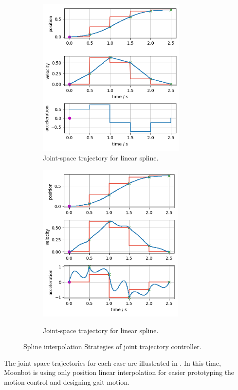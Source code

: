 \begin{figure}[t]
 \begin{subfigure}{0.5\textwidth}
 \begin{center}
  \includegraphics[height=80mm]{./fig/ros2_control/jtc/spline_position_velocity.png}
\caption{Joint-space trajectory for linear spline.}\label{cubic int}
\end{center}
\end{subfigure}
 \begin{subfigure}{0.5\textwidth}
 \begin{center}
  \includegraphics[height=80mm]{./fig/ros2_control/jtc/spline_position_velocity_acceleration.png}
\caption{Joint-space trajectory for linear spline.}\label{quintic int}
\label{subfig3}
 \end{center}
 \end{subfigure}
\vspace{-2mm}
\caption{Spline interpolation Strategies of joint trajectory controller.}
\label{interpolation}
\end{figure}

The joint-space trajectories for each case are illustrated in . In this time, Moonbot is using only position linear interpolation for easier prototyping the motion control and designing gait motion.

